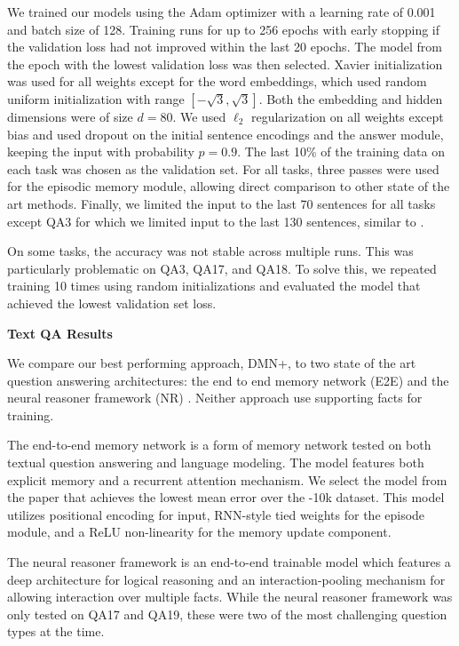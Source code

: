 \documentclass{article}
\begin{document}
We trained our models using the Adam optimizer \cite{kingma2014adam} with a learning rate of 0.001 and batch size of 128.
Training runs for up to 256 epochs with early stopping if the validation loss had not improved within the last 20 epochs.
The model from the epoch with the lowest validation loss was then selected.
Xavier initialization was used for all weights except for the word embeddings, which used random uniform initialization with range $[-\sqrt{3}, \sqrt{3}]$.
Both the embedding and hidden dimensions were of size $d = 80$.
We used $\ell_2$ regularization on all weights except bias and used dropout on the initial sentence encodings and the answer module, keeping the input with probability $p=0.9$.
The last 10\% of the training data on each task was chosen as the validation set.
For all tasks, three passes were used for the episodic memory module, allowing direct comparison to other state of the art methods.
Finally, we limited the input to the last 70 sentences for all tasks except QA3 for which we limited input to the last 130 sentences, similar to \citet{Sukhbaatar2015}.

On some tasks, the accuracy was not stable across multiple runs.
This was particularly problematic on QA3, QA17, and QA18.
To solve this, we repeated training 10 times using random initializations and evaluated the model that achieved the lowest validation set loss.

\textbf{Text QA Results}

We compare our best performing approach, DMN+, to two state of the art question answering architectures: the end to end memory network (E2E) \cite{Sukhbaatar2015} and the neural reasoner framework (NR) \cite{Peng2015}.
Neither approach use supporting facts for training.

The end-to-end memory network is a form of memory network \cite{Weston2015} tested on both textual question answering and language modeling.
The model features both explicit memory and a recurrent attention mechanism.
We select the model from the paper that achieves the lowest mean error over the \babi-10k dataset.
This model utilizes positional encoding for input, RNN-style tied weights for the episode module, and a ReLU non-linearity for the memory update component.

The neural reasoner framework is an end-to-end trainable model which features a deep architecture for logical reasoning and an interaction-pooling mechanism for allowing interaction over
multiple facts.
While the neural reasoner framework was only tested on QA17 and QA19, these were two of the most challenging question types at the time.
\end{document}
